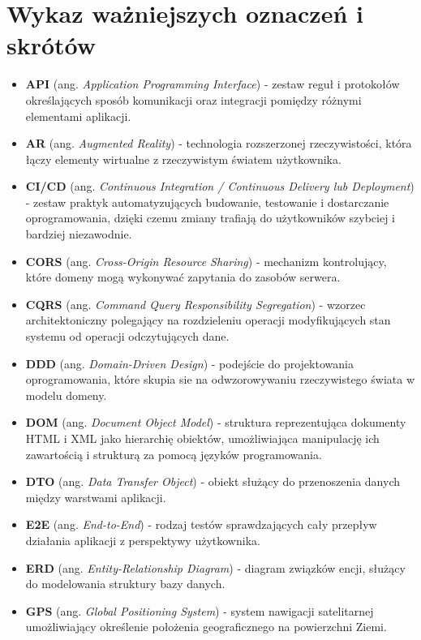 \chapter*{Wykaz ważniejszych oznaczeń i skrótów}

\begin{itemize}
  \item \textbf{API} (ang. \textit{Application Programming Interface}) - zestaw reguł i protokołów określających sposób komunikacji oraz integracji pomiędzy różnymi elementami aplikacji.
  \item \textbf{AR} (ang. \textit{Augmented Reality}) - technologia rozszerzonej rzeczywistości, która łączy elementy wirtualne z rzeczywistym światem użytkownika.
  \item \textbf{CI/CD} (ang. \textit{Continuous Integration / Continuous Delivery lub Deployment}) - zestaw praktyk automatyzujących budowanie, testowanie i dostarczanie oprogramowania, dzięki czemu zmiany trafiają do użytkowników szybciej i bardziej niezawodnie.
  \item \textbf{CORS} (ang. \textit{Cross-Origin Resource Sharing}) - mechanizm kontrolujący, które domeny mogą wykonywać zapytania do zasobów serwera.
  \item \textbf{CQRS} (ang. \textit{Command Query Responsibility Segregation}) - wzorzec architektoniczny polegający na rozdzieleniu operacji modyfikujących stan systemu od operacji odczytujących dane.
  \item \textbf{DDD} (ang. \textit{Domain-Driven Design}) - podejście do projektowania oprogramowania, które skupia sie na odwzorowywaniu rzeczywistego świata w modelu domeny.
  \item \textbf{DOM} (ang. \textit{Document Object Model}) - struktura reprezentująca dokumenty HTML i XML jako hierarchię obiektów, umożliwiająca manipulację ich zawartością i strukturą za pomocą języków programowania.
  \item \textbf{DTO} (ang. \textit{Data Transfer Object}) - obiekt służący do przenoszenia danych między warstwami aplikacji.
  \item \textbf{E2E} (ang. \textit{End-to-End}) - rodzaj testów sprawdzających cały przepływ działania aplikacji z perspektywy użytkownika.
  \item \textbf{ERD} (ang. \textit{Entity-Relationship Diagram}) - diagram związków encji, służący do modelowania struktury bazy danych.
  \item \textbf{GPS} (ang. \textit{Global Positioning System}) - system nawigacji satelitarnej umożliwiający określenie położenia geograficznego na powierzchni Ziemi.

\end{itemize}
